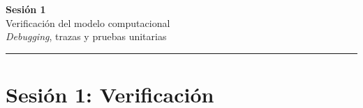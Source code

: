 \documentclass[aspectratio=1610, 10pt]{beamer}
\begin{document}
\section*{}
\begin{frame}[plain,c]
  \begin{center}
    {\Huge \color{mobiblue}\textbf{Sesión 1}}\\[0.5cm]
    {\Large Verificación del modelo computacional}\\[0.3cm]
    {\large \emph{Debugging}, trazas y pruebas unitarias}\\[0.4cm]
    {\color{mobigold}\rule{0.5\textwidth}{1.2pt}}
  \end{center}
\end{frame}

\section{Sesión 1: Verificación}
\end{document}

